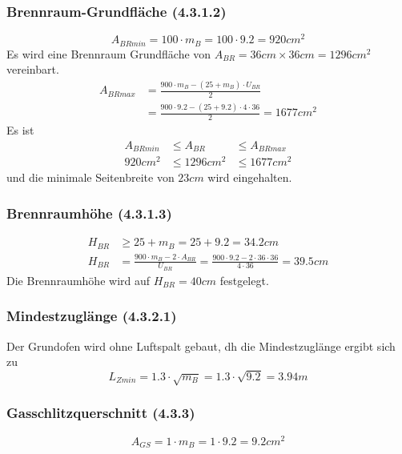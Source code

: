 \documentclass[a4paper,10pt,twoside]{article}
\begin{document}
\subsubsection{Brennraum-Grundfläche (4.3.1.2)}
\label{sec:orgc98f4cc}
\begin{equation}
A_{BRmin}=100 \cdot m_B = 100 \cdot 9.2 = 920 cm^2
\end{equation}
Es wird eine Brennraum Grundfläche von \(A_{BR} = 36 cm \times 36 cm = 1296 cm^2\) vereinbart.
\begin{align}
A_{BRmax}& =\frac{900 \cdot m_B - ( 25 + m_B) \cdot U_{BR}}{2} \\
         & =\frac{900 \cdot 9.2 - ( 25 + 9.2) \cdot 4 \cdot 36}{2} = 1677 cm^2
\end{align}
Es ist
\begin{align}
	A_{BRmin} &\le A_{BR} &\le A_{BRmax} \\
	920 cm^2  &\le 1296 cm^2  &\le 1677 cm^2
\end{align}
und die minimale Seitenbreite von \(23 cm\) wird eingehalten.
\subsubsection{Brennraumhöhe (4.3.1.3)}
\label{sec:org7742bff}
\begin{align}
H_{BR} &\ge 25 + m_B = 25 + 9.2 = 34.2 cm \\
H_{BR} &= \frac{900\cdot m_B - 2 \cdot A_{BR}}{U_{BR}} = \frac{900\cdot 9.2 - 2 \cdot 36 \cdot 36}{4 \cdot 36} = 39.5 cm
\end{align}
Die Brennraumhöhe wird auf \(H_{BR} = 40 cm\) festgelegt.

\subsubsection{Mindestzuglänge (4.3.2.1)}
\label{sec:org98a2fb1}
Der Grundofen wird ohne Luftspalt gebaut, dh die Mindestzuglänge ergibt sich zu
\begin{equation}
 L_{Zmin} = 1.3 \cdot \sqrt{m_B} = 1.3 \cdot \sqrt{9.2} = 3.94 m
\end{equation}
\subsubsection{Gasschlitzquerschnitt (4.3.3)}
\label{sec:org1d26973}
\begin{equation}
A_{GS} = 1 \cdot m_B = 1 \cdot 9.2 = 9.2 cm^2
\end{equation}
\end{document}
